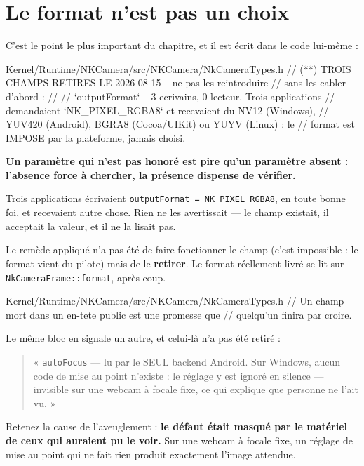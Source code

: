 \section{Le format n'est pas un choix}

C'est le point le plus important du chapitre, et il est écrit dans le code
lui-même :

\begin{nkcode}[listing options={escapeinside={(*}{*)}}]{Kernel/Runtime/NKCamera/src/NKCamera/NkCameraTypes.h}
// (*\alerte{}*) TROIS CHAMPS RETIRES LE 2026-08-15 -- ne pas les reintroduire
// sans les cabler d'abord :
//
//   `outputFormat` -- 3 ecrivains, 0 lecteur. Trois applications
//     demandaient `NK_PIXEL_RGBA8` et recevaient du NV12 (Windows),
//     YUV420 (Android), BGRA8 (Cocoa/UIKit) ou YUYV (Linux) : le
//     format est IMPOSE par la plateforme, jamais choisi.
\end{nkcode}

\begin{nkretenir}
\textbf{Un paramètre qui n'est pas honoré est pire qu'un paramètre absent :
l'absence force à chercher, la présence dispense de vérifier.}

Trois applications écrivaient \texttt{outputFormat = NK\_PIXEL\_RGBA8}, en toute
bonne foi, et recevaient autre chose. Rien ne les avertissait --- le champ
existait, il acceptait la valeur, et il ne la lisait pas.

Le remède appliqué n'a pas été de faire fonctionner le champ (c'est impossible :
le format vient du pilote) mais de le \textbf{retirer}. Le format réellement
livré se lit sur \texttt{NkCameraFrame::format}, après coup.
\end{nkretenir}

\begin{nkcode}{Kernel/Runtime/NKCamera/src/NKCamera/NkCameraTypes.h}
// Un champ mort dans un en-tete public est une promesse que
// quelqu'un finira par croire.
\end{nkcode}

\begin{nkpiege}
Le même bloc en signale un autre, et celui-là n'a pas été retiré :

\begin{quote}
« \texttt{autoFocus} --- lu par le SEUL backend Android. Sur Windows, aucun code
de mise au point n'existe : le réglage y est ignoré en silence --- invisible sur
une webcam à focale fixe, ce qui explique que personne ne l'ait vu. »
\end{quote}

Retenez la cause de l'aveuglement : \textbf{le défaut était masqué par le
matériel de ceux qui auraient pu le voir.} Sur une webcam à focale fixe, un
réglage de mise au point qui ne fait rien produit exactement l'image attendue.
\end{nkpiege}

